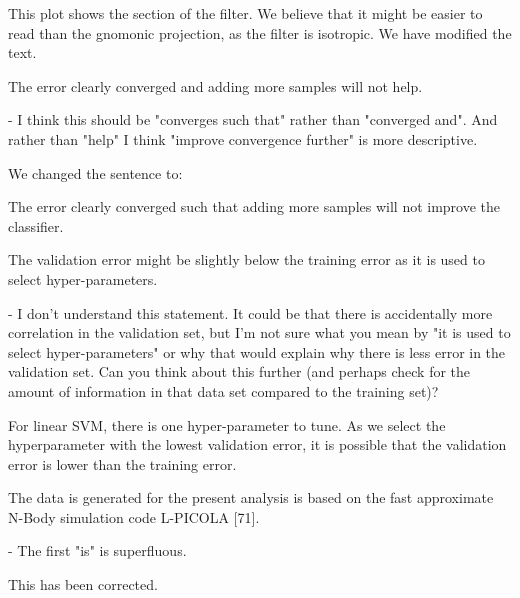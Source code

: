 \documentclass[12pt,a4paper]{article}
\newcommand{\1}{\b{1}}              %
\newcommand{\0}{\b{0}}              %
\begin{document}
This plot shows the section of the filter.
We believe that it might be easier to read than the gnomonic projection, as the filter is isotropic.
We have modified the text.

\begin{mdframed}[style=comment]
The error clearly converged and adding more samples will not help.

- I think this should be "converges such that" rather than "converged and". And rather than "help" I think "improve convergence further" is more descriptive.
\end{mdframed}

We changed the sentence to:
\begin{mdframed}[style=manuscript]
The error clearly converged such that adding more samples will not improve the classifier.
\end{mdframed}

\begin{mdframed}[style=comment]
The validation error might be slightly below the training error as it is used to select hyper-parameters.

- I don't understand this statement. It could be that there is accidentally more correlation in the validation set, but I'm not sure what you mean by "it is used to select hyper-parameters" or why that would explain why there is less error in the validation set. Can you think about this further (and perhaps check for the amount of information in that data set compared to the training set)?
\end{mdframed}


For linear SVM, there is one hyper-parameter to tune. As we select the hyperparameter with the lowest validation error, it is possible that the validation error is lower than the training error.

\begin{mdframed}[style=comment]
The data is generated for the present analysis is based on the fast approximate N-Body simulation code L-PICOLA [71].

- The first "is" is superfluous.
\end{mdframed}

This has been corrected.
\end{document}
